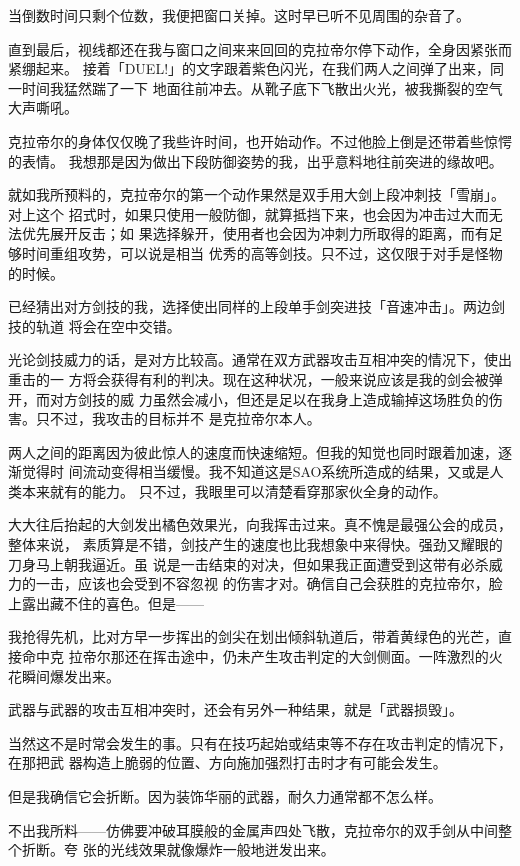\documentclass[11pt]{book}
\begin{document}
当倒数时间只剩个位数，我便把窗口关掉。这时早已听不见周围的杂音了。

直到最后，视线都还在我与窗口之间来来回回的克拉帝尔停下动作，全身因紧张而紧绷起来。
接着「DUEL!」的文字跟着紫色闪光，在我们两人之间弹了出来，同一时间我猛然踹了一下
地面往前冲去。从靴子底下飞散出火光，被我撕裂的空气大声嘶吼。

克拉帝尔的身体仅仅晚了我些许时间，也开始动作。不过他脸上倒是还带着些惊愕的表情。
我想那是因为做出下段防御姿势的我，出乎意料地往前突进的缘故吧。

就如我所预料的，克拉帝尔的第一个动作果然是双手用大剑上段冲刺技「雪崩」。对上这个
招式时，如果只使用一般防御，就算抵挡下来，也会因为冲击过大而无法优先展开反击；如
果选择躲开，使用者也会因为冲刺力所取得的距离，而有足够时间重组攻势，可以说是相当
优秀的高等剑技。只不过，这仅限于对手是怪物的时候。

已经猜出对方剑技的我，选择使出同样的上段单手剑突进技「音速冲击」。两边剑技的轨道
将会在空中交错。

光论剑技威力的话，是对方比较高。通常在双方武器攻击互相冲突的情况下，使出重击的一
方将会获得有利的判决。现在这种状况，一般来说应该是我的剑会被弹开，而对方剑技的威
力虽然会减小，但还是足以在我身上造成输掉这场胜负的伤害。只不过，我攻击的目标并不
是克拉帝尔本人。

两人之间的距离因为彼此惊人的速度而快速缩短。但我的知觉也同时跟着加速，逐渐觉得时
间流动变得相当缓慢。我不知道这是SAO系统所造成的结果，又或是人类本来就有的能力。
只不过，我眼里可以清楚看穿那家伙全身的动作。

大大往后抬起的大剑发出橘色效果光，向我挥击过来。真不愧是最强公会的成员，整体来说，
素质算是不错，剑技产生的速度也比我想象中来得快。强劲又耀眼的刀身马上朝我逼近。虽
说是一击结束的对决，但如果我正面遭受到这带有必杀威力的一击，应该也会受到不容忽视
的伤害才对。确信自己会获胜的克拉帝尔，脸上露出藏不住的喜色。但是——

我抢得先机，比对方早一步挥出的剑尖在划出倾斜轨道后，带着黄绿色的光芒，直接命中克
拉帝尔那还在挥击途中，仍未产生攻击判定的大剑侧面。一阵激烈的火花瞬间爆发出来。

武器与武器的攻击互相冲突时，还会有另外一种结果，就是「武器损毁」。

当然这不是时常会发生的事。只有在技巧起始或结束等不存在攻击判定的情况下，在那把武
器构造上脆弱的位置、方向施加强烈打击时才有可能会发生。

但是我确信它会折断。因为装饰华丽的武器，耐久力通常都不怎么样。

不出我所料——仿佛要冲破耳膜般的金属声四处飞散，克拉帝尔的双手剑从中间整个折断。夸
张的光线效果就像爆炸一般地迸发出来。
\end{document}
